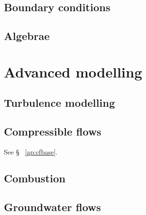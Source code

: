 \documentclass[a4paper,10pt,twoside]{csdoc}
\begin{document}
\chapter{Boundary conditions}\label{chapter:bndcnd}




\chapter{Algebrae}


\part{Advanced modelling}

\setcounter{section}{0}
\setcounter{equation}{0}
\setcounter{figure}{0}

\chapter{Turbulence modelling}\label{chapter:turbul}


\chapter{Compressible flows}
See \S~ \ref{ap:cfbase}.


\chapter{Combustion}






\chapter{Groundwater flows}

\end{document}
